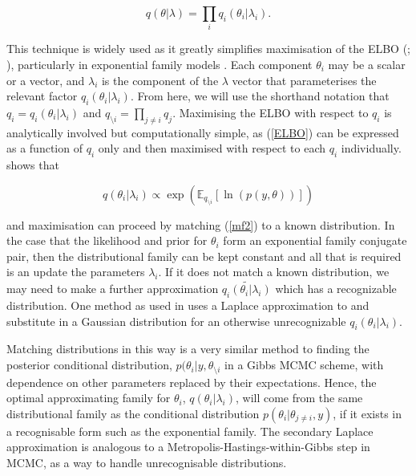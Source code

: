 \documentclass{article}\usepackage[]{graphicx}\usepackage[]{color}
\begin{document}
\begin{equation}
\label{mf1}
q(\theta|\lambda) = \prod_i q_i(\theta_i | \lambda_i).
\end{equation}

This technique is widely used as it greatly simplifies maximisation of the ELBO (\citealp{Jordan1999}; \citealp{Bishop2006}), particularly in exponential family models \citep{Wainwright2008}. Each component $\theta_i$ may be a scalar or a vector, and $\lambda_i$ is the component of the $\lambda$ vector that parameterises the relevant factor $q_i(\theta_i |\lambda_i)$. From here, we will use the shorthand notation that $q_i = q_i(\theta_i|\lambda_i)$ and $q_{\setminus i} = \prod_{j\neq i}q_j$. Maximising the ELBO with respect to $q_i$ is analytically involved but computationally simple, as (\ref{ELBO}) can be expressed as a function of $q_i$ only and then maximised with respect to each $q_i$ individually. \citet{Attias1999} shows that 

\begin{equation}
\label{mf2}
q(\theta_i | \lambda_i) \propto\exp( \mathbb{E}_{q_{\setminus i}} [\ln(p(y,\theta))])
\end{equation}

and maximisation can proceed by matching (\ref{mf2}) to a known distribution. In the case that the likelihood and prior for $\theta_i$ form an exponential family conjugate pair, then the distributional family can be kept constant and all that is required is an update the parameters $\lambda_i$. If it does not match a known distribution, we may need to make a further approximation $\tilde{q_i(\theta_i|\lambda_i)}$ which has a recognizable distribution. One method as used in \citet{Friston2006} uses a Laplace approximation to and substitute in a Gaussian distribution for an otherwise unrecognizable $q_i(\theta_i | \lambda_i)$. 

Matching distributions in this way is a very similar method to finding the posterior conditional distribution, $p(\theta_i | y, \theta_{\setminus i}$ in a Gibbs MCMC scheme, with dependence on other parameters replaced by their expectations. Hence, the optimal approximating family for $\theta_i$, $q(\theta_i | \lambda_i)$, will come from the same distributional family as the conditional distribution $p(\theta_i | \theta_{j \neq i}, y)$, if it exists in a recognisable form such as the exponential family. The secondary Laplace approximation is analogous to a Metropolis-Hastings-within-Gibbs step in MCMC, as a way to handle unrecognisable distributions.
\vspace{5mm}
\end{document}
